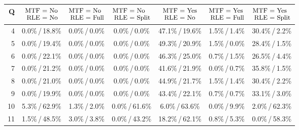 \newcommand{\perc}[2]{\small #1\%\,/\,#2\%}
\newcommand{\p}{\phantom{0}}

\begin{tabular}{r|c|c|c|c|c|c}
	Q
	&
	$\begin{aligned}
		\text{\small MTF }&\text{\small = No} \\[-5pt]
		\text{\small RLE }&\text{\small = No}
	\end{aligned}$
	&
	$\begin{aligned}
		\text{\small MTF }&\text{\small = No} \\[-5pt]
		\text{\small RLE }&\text{\small = Full}
	\end{aligned}$
	&
	$\begin{aligned}
		\text{\small MTF }&\text{\small = No} \\[-5pt]
		\text{\small RLE }&\text{\small = Split}
	\end{aligned}$
	&
	$\begin{aligned}
		\text{\small MTF }&\text{\small = Yes} \\[-5pt]
		\text{\small RLE }&\text{\small = No}
	\end{aligned}$
	&
	$\begin{aligned}
		\text{\small MTF }&\text{\small = Yes} \\[-5pt]
		\text{\small RLE }&\text{\small = Full}
	\end{aligned}$
	&
	$\begin{aligned}
		\text{\small MTF }&\text{\small = Yes} \\[-5pt]
		\text{\small RLE }&\text{\small = Split}
	\end{aligned}$
	\\
	\hline
	 4 & \perc{0.0}{18.8} & \perc{0.0}{0.0} & \perc{0.0}{\p0.0} & \perc{47.1}{19.6}  & \perc{1.5}{1.4} & \perc{30.4}{\p2.2} \\
	 5 & \perc{0.0}{19.4} & \perc{0.0}{0.0} & \perc{0.0}{\p0.0} & \perc{49.3}{20.9}  & \perc{1.5}{0.0} & \perc{28.4}{\p1.5} \\
	 6 & \perc{0.0}{22.1} & \perc{0.0}{0.0} & \perc{0.0}{\p0.0} & \perc{46.3}{25.0}  & \perc{0.7}{1.5} & \perc{26.5}{\p4.4} \\
	 7 & \perc{0.0}{21.2} & \perc{0.0}{0.0} & \perc{0.0}{\p0.0} & \perc{41.6}{21.9}  & \perc{0.0}{0.7} & \perc{35.8}{\p1.5} \\
	 8 & \perc{0.0}{21.0} & \perc{0.0}{0.0} & \perc{0.0}{\p0.0} & \perc{44.9}{21.7}  & \perc{1.5}{1.4} & \perc{30.4}{\p2.2} \\
	 9 & \perc{0.0}{19.9} & \perc{0.0}{0.0} & \perc{0.0}{\p0.0} & \perc{43.4}{22.1}  & \perc{0.7}{0.7} & \perc{33.1}{\p3.0} \\
	10 & \perc{5.3}{62.9} & \perc{1.3}{2.0} & \perc{0.0}{61.6}  & \perc{\p6.0}{63.6} & \perc{0.0}{9.9} & \perc{\p2.0}{62.3} \\
	11 & \perc{1.5}{48.5} & \perc{3.0}{3.8} & \perc{0.0}{43.2}  & \perc{18.2}{62.1}  & \perc{0.8}{5.3} & \perc{\p0.0}{58.3} \\
\end{tabular}